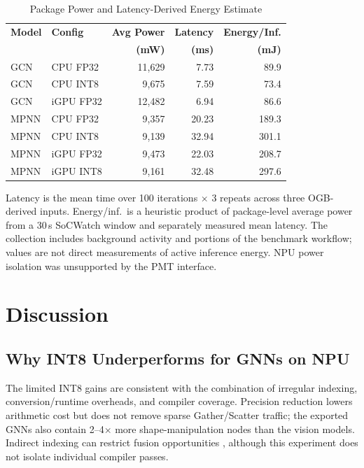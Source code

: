 \documentclass[conference]{IEEEtran}
\begin{document}
\begin{table}[htbp]
\caption{Package Power and Latency-Derived Energy Estimate}
\begin{center}
\begin{tabular}{llrrr}
\toprule
\textbf{Model} & \textbf{Config} & \textbf{Avg Power} & \textbf{Latency} & \textbf{Energy/Inf.} \\
 & & \textbf{(mW)} & \textbf{(ms)} & \textbf{(mJ)} \\
\midrule
\rowcolor{gray!15} GCN & CPU FP32 & 11,629 & 7.73 & 89.9 \\
GCN & CPU INT8 & 9,675 & 7.59 & 73.4 \\
\rowcolor{gray!15} GCN & iGPU FP32 & 12,482 & 6.94 & 86.6 \\
\midrule
\rowcolor{gray!15} MPNN & CPU FP32 & 9,357 & 20.23 & 189.3 \\
MPNN & CPU INT8 & 9,139 & 32.94 & 301.1 \\
\rowcolor{gray!15} MPNN & iGPU FP32 & 9,473 & 22.03 & 208.7 \\
MPNN & iGPU INT8 & 9,161 & 32.48 & 297.6 \\
\bottomrule
\end{tabular}
\label{tab:energy}
\end{center}
\footnotesize{Latency is the mean time over 100 iterations $\times$ 3 repeats across three OGB-derived inputs. Energy/inf.\ is a heuristic product of package-level average power from a 30\,s SoCWatch window and separately measured mean latency. The collection includes background activity and portions of the benchmark workflow; values are not direct measurements of active inference energy. NPU power isolation was unsupported by the PMT interface.}
\end{table}

\section{Discussion}

\subsection{Why INT8 Underperforms for GNNs on NPU}
The limited INT8 gains are consistent with the combination of irregular indexing, conversion/runtime overheads, and compiler coverage. Precision reduction lowers arithmetic cost but does not remove sparse Gather/Scatter traffic; the exported GNNs also contain 2--4$\times$ more shape-manipulation nodes than the vision models. Indirect indexing can restrict fusion opportunities \cite{10.1145/3453483.3454083}, although this experiment does not isolate individual compiler passes.
\end{document}
